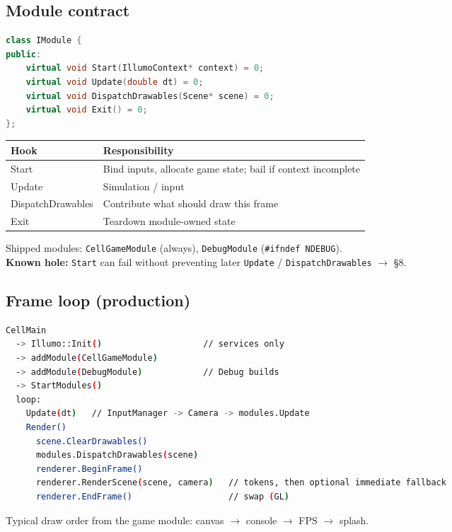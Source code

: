 \documentclass[10pt,a4paper]{article}
\begin{document}
\subsection{Module contract}
\begin{lstlisting}[language=C++]
class IModule {
public:
    virtual void Start(IllumoContext* context) = 0;
    virtual void Update(double dt) = 0;
    virtual void DispatchDrawables(Scene* scene) = 0;
    virtual void Exit() = 0;
};
\end{lstlisting}

\begin{table}[h!]
\centering
\small
\begin{tabularx}{\textwidth}{l X}
\toprule
\textbf{Hook} & \textbf{Responsibility} \\
\midrule
Start & Bind inputs, allocate game state; bail if context incomplete \\
Update & Simulation / input \\
DispatchDrawables & Contribute what should draw this frame \\
Exit & Teardown module-owned state \\
\bottomrule
\end{tabularx}
\end{table}

\noindent Shipped modules: \texttt{CellGameModule} (always), \texttt{DebugModule} (\texttt{\#ifndef NDEBUG}).\\
\textbf{Known hole:} \texttt{Start} can fail without preventing later \texttt{Update} / \texttt{DispatchDrawables} $\rightarrow$ \S 8.

\subsection{Frame loop (production)}
\begin{lstlisting}[language=bash]
CellMain
  -> Illumo::Init()                    // services only
  -> addModule(CellGameModule)
  -> addModule(DebugModule)            // Debug builds
  -> StartModules()
  loop:
    Update(dt)   // InputManager -> Camera -> modules.Update
    Render()
      scene.ClearDrawables()
      modules.DispatchDrawables(scene)
      renderer.BeginFrame()
      renderer.RenderScene(scene, camera)   // tokens, then optional immediate fallback
      renderer.EndFrame()                   // swap (GL)
\end{lstlisting}

\noindent Typical draw order from the game module: canvas $\rightarrow$ console $\rightarrow$ FPS $\rightarrow$ splash.
\end{document}
